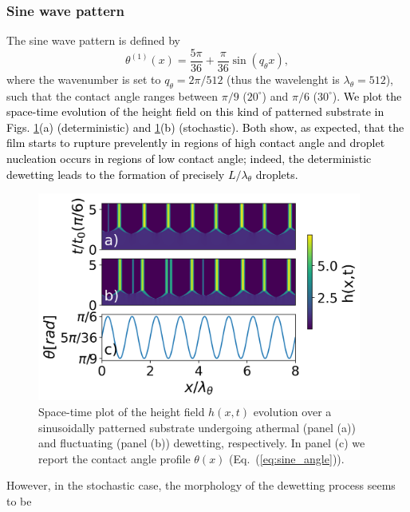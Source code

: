 \subsubsection{Sine wave pattern}\label{subsubsec:sine}
The sine wave pattern is defined by
\begin{equation}\label{eq:sine_angle}
    {\theta^{(1)}}(x) = \frac{5\pi}{36} + \frac{\pi}{36} \sin\left(q_{\theta} x\right),
\end{equation}
where the wavenumber is set to $q_{\theta} = 2\pi/512$ (thus the wavelenght is $\lambda_{\theta}=512$), such that 
the contact angle ranges between $\pi/9$ ($20^{\circ}$) and $\pi/6$ ($30^{\circ}$).
\textcolor{black}{We plot the space-time evolution of the height field on this kind of patterned substrate in Figs. \ref{fig:patterned_sine8_difference_20-30}(a) (deterministic) and  \ref{fig:patterned_sine8_difference_20-30}(b) (stochastic). 
Both show, as expected, that the film starts to rupture prevelently in regions of high contact angle and droplet nucleation occurs in regions of low contact angle; indeed, the deterministic dewetting leads to the formation of precisely $L/\lambda_{\theta}$ droplets.}
\begin{figure}
    \centering
    \includegraphics[width=0.95\textwidth]{graphics/spacedepCA_['sine', '1e7', '10', 25, '9_3', 10000000.0]_v2.png}
    \caption{Space-time plot of the height field $h(x,t)$ evolution over a sinusoidally patterned substrate undergoing athermal 
    (panel (a)) and fluctuating (panel (b)) dewetting, respectively. In panel (c) we report the contact angle profile $\theta(x)$ (Eq.~(\ref{eq:sine_angle})).} 
    \label{fig:patterned_sine8_difference_20-30}
\end{figure}
However, in the stochastic case, the morphology of the dewetting process seems to be 

